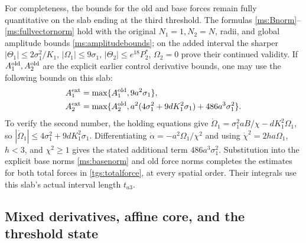 For completeness, the bounds for the old and base forces remain
fully quantitative on the slab ending at the third threshold. The formulas
\eqref{ms:Bnorm}--\eqref{ms:fullvectornorm} hold with the original
$N_1=1,N_2=N$, radii, and global amplitude bounds
\eqref{ms:amplitudebounds}; on the added interval the sharper
$|\Theta_1|\leq2\sigma_1^2/K_1$, $|\Omega_1|\leq9\sigma_1$,
$|\Theta_2|\leq e^{18}P_2^*$, $\Omega_2=0$ prove their continued
validity. If $A_1^{\rm old},A_2^{\rm old}$ are the explicit earlier
control derivative bounds, one may use the following bounds on this slab:
\begin{equation}\label{tgs:oldcontrolbounds}
 \begin{split}
 A_1^{\rm ext}&=\max\{A_1^{\rm old},9a^2\sigma_1\},\\
 A_2^{\rm ext}&=\max\{A_2^{\rm old},
              a^2(4\sigma_1^2+9dK_1^2\sigma_1)
                         +486a^3\sigma_1^2\}.
 \end{split}
\end{equation}
To verify the second number, the holding equations give
$\dot\Omega_1=\sigma_1^2aB/\chi-dK_1^2\Omega_1$,
so $|\dot\Omega_1|\leq4\sigma_1^2+9dK_1^2\sigma_1$.
Differentiating $\dot\alpha=-a^2\Omega_1/\chi^2$ and using
$\dot\chi^2=2ha\Omega_1$, $h<3$, and $\chi^2\geq1$
gives the stated additional term $486a^3\sigma_1^2$.
Substitution into the explicit base norms \eqref{ms:basenorm}
and old force norms completes the estimates for both total forces
in \eqref{tgs:totalforce}, at every spatial order. Their integrals
use this slab's actual interval length $t_{a3}$.

\subsection{Mixed derivatives, affine core, and the threshold state}


